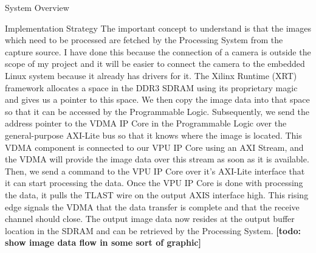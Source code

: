 \documentclass{matthijs}
\begin{document}
\begin{hoofdstuk}{System Overview}
\begin{paragraaf}{Implementation Strategy}
			The important concept to understand is that the images which need to be processed are fetched by the Processing System from the capture source.
			I have done this because the connection of a camera is outside the scope of my project and it will be easier to connect the camera to the embedded Linux system because it already has drivers for it.
			The Xilinx Runtime (XRT) framework allocates a space in the DDR3 SDRAM using its proprietary magic and gives us a pointer to this space.
			We then copy the image data into that space so that it can be accessed by the Programmable Logic.
			Subsequently, we send the address pointer to the VDMA IP Core in the Programmable Logic over the general-purpose AXI-Lite bus so that it knows where the image is located.
			This VDMA component is connected to our VPU IP Core using an AXI Stream, and the VDMA will provide the image data over this stream as soon as it is available.
			Then, we send a command to the VPU IP Core over it's AXI-Lite interface that it can start processing the data.
			Once the VPU IP Core is done with processing the data, it pulls the TLAST wire on the output AXIS interface high.
			This rising edge signals the VDMA that the data transfer is complete and that the receive channel should close.
			The output image data now resides at the output buffer location in the SDRAM and can be retrieved by the Processing System.
			\textbf{[todo: show image data flow in some sort of graphic]}

		\end{paragraaf}

	\end{hoofdstuk}
\end{document}

